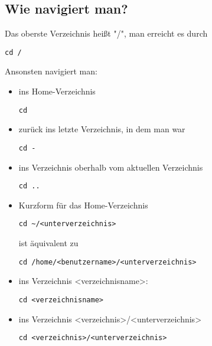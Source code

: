 \documentclass[a4paper,12pt]{article}
\begin{document}
\subsection{Wie navigiert man?}
Das oberste Verzeichnis heißt "/", man erreicht es durch 
\begin{lstlisting}
cd /
\end{lstlisting}	
Ansonsten navigiert man:
\begin{itemize}
\item ins Home-Verzeichnis
\begin{lstlisting}
cd
\end{lstlisting}
\item zurück ins letzte Verzeichnis, in dem man war 
\begin{lstlisting}
cd -
\end{lstlisting}
\item ins Verzeichnis oberhalb vom aktuellen Verzeichnis 
\begin{lstlisting}
cd ..
\end{lstlisting}
\item Kurzform für das Home-Verzeichnis 
\begin{lstlisting}
cd ~/<unterverzeichnis>
\end{lstlisting} 
ist äquivalent zu 
\begin{lstlisting}
cd /home/<benutzername>/<unterverzeichnis>
\end{lstlisting}
\item ins Verzeichnis <verzeichnisname>: 
\begin{lstlisting}
cd <verzeichnisname>
\end{lstlisting}
\item ins Verzeichnis <verzeichnis>/<unterverzeichnis> 
\begin{lstlisting}
cd <verzeichnis>/<unterverzeichnis>
\end{lstlisting}
\end{itemize}
\end{document}
